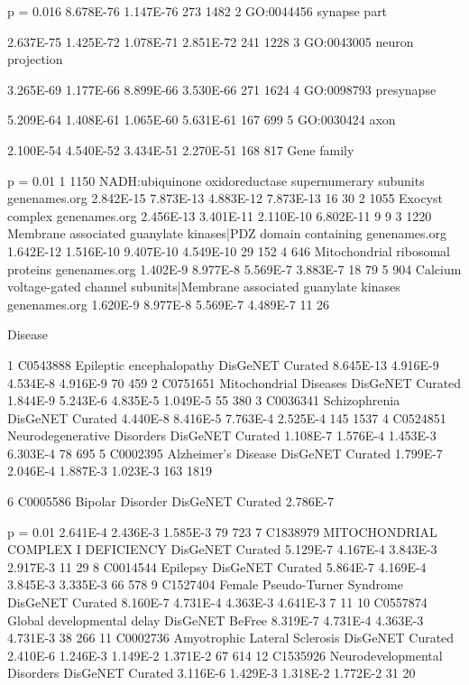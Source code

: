 p = 0.016 
8.678E-76 
1.147E-76 
273 
1482 
2 
GO:0044456 
synapse part 

2.637E-75 
1.425E-72 
1.078E-71 
2.851E-72 
241 
1228 
3 
GO:0043005 
neuron projection 

3.265E-69 
1.177E-66 
8.899E-66 
3.530E-66 
271 
1624 
4 
GO:0098793 
presynapse 

5.209E-64 
1.408E-61 
1.065E-60 
5.631E-61 
167 
699 
5 
GO:0030424 
axon 

2.100E-54 
4.540E-52 
3.434E-51 
2.270E-51 
168 
817
Gene family



p = 0.01
1 
1150 
NADH:ubiquinone oxidoreductase supernumerary subunits 
genenames.org 
2.842E-15 
7.873E-13 
4.883E-12 
7.873E-13 
16 
30 
2 
1055 
Exocyst complex 
genenames.org 
2.456E-13 
3.401E-11 
2.110E-10 
6.802E-11 
9 
9 
3 
1220 
Membrane associated guanylate kinases|PDZ domain containing 
genenames.org 
1.642E-12 
1.516E-10 
9.407E-10 
4.549E-10 
29 
152 
4 
646 
Mitochondrial ribosomal proteins 
genenames.org 
1.402E-9 
8.977E-8 
5.569E-7 
3.883E-7 
18 
79 
5 
904 
Calcium voltage-gated channel subunits|Membrane associated guanylate kinases 
genenames.org 
1.620E-9 
8.977E-8 
5.569E-7 
4.489E-7 
11 
26

Disease


1 
C0543888 
Epileptic encephalopathy 
DisGeNET Curated 
8.645E-13 
4.916E-9 
4.534E-8 
4.916E-9 
70 
459 
2 
C0751651 
Mitochondrial Diseases 
DisGeNET Curated 
1.844E-9 
5.243E-6 
4.835E-5 
1.049E-5 
55 
380 
3 
C0036341 
Schizophrenia 
DisGeNET Curated 
4.440E-8 
8.416E-5 
7.763E-4 
2.525E-4 
145 
1537 
4 
C0524851 
Neurodegenerative Disorders 
DisGeNET Curated 
1.108E-7 
1.576E-4 
1.453E-3 
6.303E-4 
78 
695 
5 
C0002395 
Alzheimer's Disease 
DisGeNET Curated 
1.799E-7 
2.046E-4 
1.887E-3 
1.023E-3 
163 
1819


6 
C0005586 
Bipolar Disorder 
DisGeNET Curated 
2.786E-7 

p = 0.01
2.641E-4 
2.436E-3 
1.585E-3 
79 
723 
7 
C1838979 
MITOCHONDRIAL COMPLEX I DEFICIENCY 
DisGeNET Curated 
5.129E-7 
4.167E-4 
3.843E-3 
2.917E-3 
11 
29 
8 
C0014544 
Epilepsy 
DisGeNET Curated 
5.864E-7 
4.169E-4 
3.845E-3 
3.335E-3 
66 
578 
9 
C1527404 
Female Pseudo-Turner Syndrome 
DisGeNET Curated 
8.160E-7 
4.731E-4 
4.363E-3 
4.641E-3 
7 
11 
10 
C0557874 
Global developmental delay 
DisGeNET BeFree 
8.319E-7 
4.731E-4 
4.363E-3 
4.731E-3 
38 
266 
11 
C0002736 
Amyotrophic Lateral Sclerosis 
DisGeNET Curated 
2.410E-6 
1.246E-3 
1.149E-2 
1.371E-2 
67 
614 
12 
C1535926 
Neurodevelopmental Disorders 
DisGeNET Curated 
3.116E-6 
1.429E-3 
1.318E-2 
1.772E-2 
31 
20

